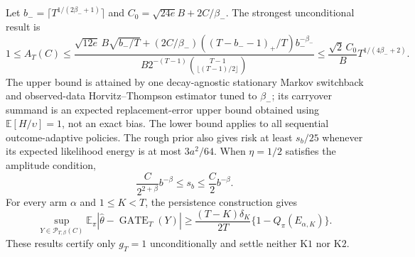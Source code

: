 Let \(b_-=\lceil T^{1/(2\beta_-+1)}\rceil\) and \(C_0=\sqrt{24e}B+2C/\beta_-\). The strongest unconditional result is \[1\le A_T(C)\le\frac{\sqrt{12e}\,B\sqrt{b_-/T}+(2C/\beta_-)((T-b_--1)_+/T)b_-^{-\beta_-}}{B2^{-(T-1)}\binom{T-1}{\lfloor(T-1)/2\rfloor}}\le \frac{\sqrt2\,C_0}{B}T^{1/(4\beta_-+2)}.\] The upper bound is attained by one decay-agnostic stationary Markov switchback and observed-data Horvitz--Thompson estimator tuned to \(\beta_-\); its carryover summand is an expected replacement-error upper bound obtained using \(\mathbb E[H/\upsilon]=1\), not an exact bias. The lower bound applies to all sequential outcome-adaptive policies. The rough prior also gives risk at least \(s_b/25\) whenever its expected likelihood energy is at most \(3a^2/64\). When \(\eta=1/2\) satisfies the amplitude condition, \[\frac{C}{2^{2+\beta}}b^{-\beta}\le s_b\le\frac C2b^{-\beta}.\] For every arm \(\alpha\) and \(1\le K<T\), the persistence construction gives \[\sup_{Y\in\mathcal P_{T,\beta}(C)}\mathbb E_\pi\left|\widehat\theta-\operatorname{GATE}_T(Y)\right|\ge\frac{(T-K)\delta_K}{2T}\{1-Q_\pi(E_{\alpha,K})\}.\] These results certify only \(g_T=1\) unconditionally and settle neither \(\mathrm{K1}\) nor \(\mathrm{K2}\).